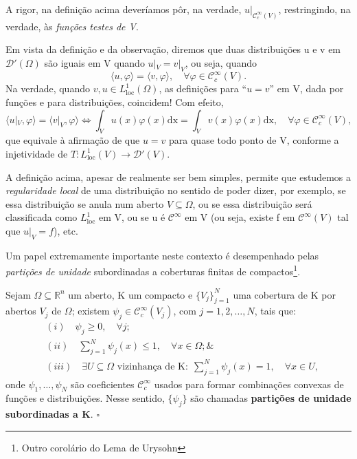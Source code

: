 \documentclass[../distribution_theory_notes.tex]{subfiles}
\begin{document}
\begin{tcolorbox}[
		skin=enhanced,
		title=Observação,
		fonttitle=\bfseries,
		colframe=black,
		colbacktitle=cyan!75!white,
		colback=cyan!15,
		colbacklower=black,
		coltitle=black,
		drop fuzzy shadow,
	]
	A rigor, na definição acima deveríamos pôr, na verdade, \(u|_{\mathcal{C}_{c}^{\infty}(V)}\), restringindo, na verdade, às \textit{funções testes de V}.
\end{tcolorbox}
Em vista da definição e da observação, diremos que duas distribuições u e v em \(\mathcal{D}'(\Omega )\) são iguais em V quando \(u|_{V} = v|_{V}\), ou seja, quando
\[
	\langle u, \varphi  \rangle = \langle v, \varphi  \rangle,\quad \forall \varphi \in \mathcal{C}_{c}^{\infty}(V).
\]
Na verdade, quando \(v, u\in L_{\mathrm{loc}}^{1}(\Omega )\), as definições para ``\(u = v\)'' em V, dada por funções e para distribuições, coincidem! Com efeito,
\[
	\langle u|_{V}, \varphi  \rangle = \langle v|_{V}, \varphi  \rangle \Longleftrightarrow \int_{V}^{}u(x)\varphi(x) \mathrm{dx} = \int_{V}^{}v(x)\varphi(x) \mathrm{dx}, \quad \forall \varphi \in \mathcal{C}_{c}^{\infty}(V),
\]
que equivale à afirmação de que \(u=v\) para quase todo ponto de V, conforme a injetividade de \(T:L_{\mathrm{loc}}^{1}(V)\rightarrow \mathcal{D}'(V)\).

A definição acima, apesar de realmente ser bem simples, permite que estudemos a \textit{regularidade local} de uma distribuição no sentido de poder dizer, por exemplo, se essa distribuição se anula num aberto \(V\subseteq \Omega \), ou se essa distribuição será classificada como \(L_{\mathrm{loc}}^{1}\) em V, ou se u é \(\mathcal{C}^{\infty}\) em V (ou seja, existe f em \(\mathcal{C}^{\infty}(V)\) tal que \(u|_{V}=f\)), etc.

Um papel extremamente importante neste contexto é desempenhado pelas \textit{partições de unidade} subordinadas a coberturas finitas de compactos\footnote{Outro corolário do Lema de Urysohn}.

\begin{def*}
	Sejam \(\Omega \subseteq \mathbb{R}^{n}\) um aberto, K um compacto e \(\{V_{j}\}_{j=1}^{N}\) uma cobertura de K por abertos \(V_{j}\) de \(\Omega \); existem \(\psi_{j}\in \mathcal{C}_{c}^{\infty}(V_{j})\), com \(j=1,2,\dotsc ,N\), tais que:
	\begin{align*}
		 & (i)\quad \psi_{j}\geq 0,\quad \forall j;                                                                                 \\
		 & (ii)\quad \sum\limits_{j=1}^{N}\psi_{j}(x)\leq 1,\quad \forall x\in \Omega ; \&                                          \\
		 & (iii)\quad \exists U\subseteq \Omega \text{ vizinhança de K}:\; \sum\limits_{j=1}^{N}\psi_{j}(x)=1,\quad \forall x\in U,
	\end{align*}
	onde \(\psi_1,\dotsc , \psi_N\) são coeficientes \(\mathcal{C}_{c}^{\infty}\) usados para formar combinações convexas de funções e distribuições. Nesse sentido, \(\{\psi_{j}\}\) são chamadas \textbf{partições de unidade subordinadas a K}. \(\square\)
\end{def*}
\end{document}

